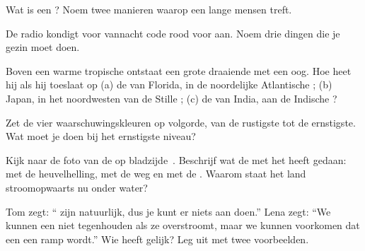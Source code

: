 \begin{exercise}[$\star$]\label{exo:g5:natural-hazards:3}
Wat is een ? Noem twee manieren waarop een lange  mensen treft.
\end{exercise}

\begin{exercise}[$\star$]\label{exo:g5:natural-hazards:4}
De radio kondigt voor vannacht code rood voor  aan. Noem drie dingen
die je gezin moet doen.
\end{exercise}

\begin{exercise}[$\star$]\label{exo:g5:natural-hazards:5}
Boven een warme tropische  ontstaat een grote draaiende  met een
oog. Hoe heet hij als hij toeslaat op (a) de  van Florida, in de
noordelijke Atlantische ; (b) Japan, in het noordwesten van de Stille
; (c) de  van India, aan de Indische ?
\end{exercise}

\begin{exercise}[$\star$]\label{exo:g5:natural-hazards:6}
Zet de vier waarschuwingskleuren op volgorde, van de rustigste tot de
ernstigste. Wat moet je doen bij het ernstigste niveau?
\end{exercise}

\begin{exercise}[$\star\star$]\label{exo:g5:natural-hazards:7}
Kijk naar de foto van de  op
bladzijde~\pageref{fig:g5:natural-hazards:landslide}. Beschrijf wat de
 met het  heeft gedaan: met de heuvelhelling, met de weg
en met de . Waarom staat het land stroomopwaarts nu onder water?
\end{exercise}

\begin{exercise}[$\star\star$]\label{exo:g5:natural-hazards:8}
Tom zegt: `` zijn natuurlijk, dus je kunt er niets aan
doen.'' Lena zegt: ``We kunnen een  niet tegenhouden als ze
overstroomt, maar we kunnen voorkomen dat een  een ramp wordt.''
Wie heeft gelijk? Leg uit met twee voorbeelden.
\end{exercise}

